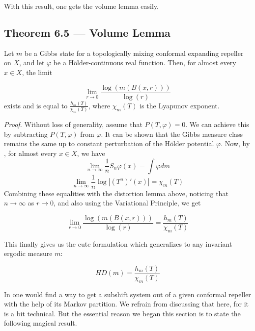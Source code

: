 \documentclass[11pt,a4paper]{article}
\begin{document}
With this result, one gets the volume lemma easily.
\subsection*{Theorem 6.5 — Volume Lemma}
    Let $m$ be a Gibbs state for a topologically mixing conformal expanding
    repeller on $X$, and let $\varphi$ be a H\"older-continuous real function.
    Then, for almost every $x\in X$, the limit

    $$\lim_{r\rightarrow 0}\frac{\log(m(B(x, r)))}{\log(r)}$$
    exists and is equal to $\frac{h_m(T)}{\chi_m(T)}$, where $\chi_m(T)$ is the Lyapunov exponent.

\textit{Proof.}
    Without loss of generality, assume that $P(T,\varphi) = 0$. We can achieve this by subtracting $P(T,\varphi)$ from $\varphi$. It can be shown that the Gibbs measure class remains the same up to constant perturbation of the H\"older potential $\varphi$. Now, by , for almost every $x\in X$, we have
    $$\lim_{n\rightarrow \infty }\frac{1}{n}S_n\varphi(x) = \int \varphi dm$$
    $$\lim_{n\rightarrow \infty} \frac{1}{n}\log|(T^n)'(x)| = \chi_m(T)$$
    Combining these equalities with the distortion lemma above, noticing that
    $n\rightarrow\infty$ as $r\rightarrow0$, and also using the Variational
    Principle, we get

    $$\lim_{r\rightarrow 0}\frac{\log(m(B(x, r)))}{\log(r)} = \frac{h_m(T)}{\chi_m(T)}$$


This finally gives us the cute formulation which generalizes to any invariant
ergodic measure $m$:

$$HD(m) = \frac{h_m(T)}{\chi_m(T)}$$


In \cite{zinsmeister2000thermodynamic} one would find a way to get a subshift
system out of a given conformal repeller with the help of its Markov
partition. We refrain from discussing that here, for it is a bit technical. But
the essential reason we began this section is to state the following magical
result.
\end{document}
